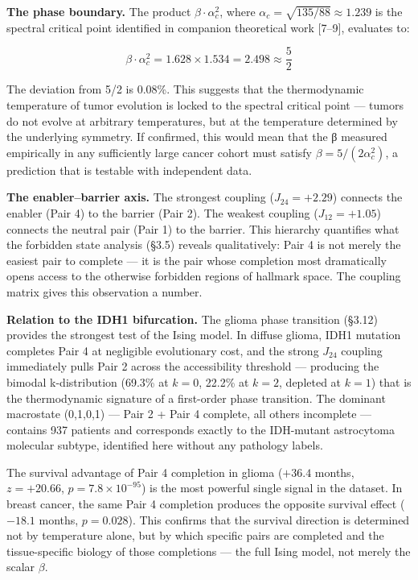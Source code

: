 \documentclass[
  11pt,
]{article}
\begin{document}
\textbf{The phase boundary.} The product \(\beta \cdot \alpha_c^2\),
where \(\alpha_c = \sqrt{135/88} \approx 1.239\) is the spectral
critical point identified in companion theoretical work {[}7--9{]},
evaluates to:

\[\beta \cdot \alpha_c^2 = 1.628 \times 1.534 = 2.498 \approx \frac{5}{2} \tag{9}\]

The deviation from 5/2 is 0.08\%. This suggests that the thermodynamic
temperature of tumor evolution is locked to the spectral critical point
--- tumors do not evolve at arbitrary temperatures, but at the
temperature determined by the underlying symmetry. If confirmed, this
would mean that the β measured empirically in any sufficiently large
cancer cohort must satisfy \(\beta = 5/(2\alpha_c^2)\), a prediction
that is testable with independent data.

\textbf{The enabler--barrier axis.} The strongest coupling
(\(J_{24} = +2.29\)) connects the enabler (Pair 4) to the barrier (Pair
2). The weakest coupling (\(J_{12} = +1.05\)) connects the neutral pair
(Pair 1) to the barrier. This hierarchy quantifies what the forbidden
state analysis (§3.5) reveals qualitatively: Pair 4 is not merely the
easiest pair to complete --- it is the pair whose completion most
dramatically opens access to the otherwise forbidden regions of hallmark
space. The coupling matrix gives this observation a number.

\textbf{Relation to the IDH1 bifurcation.} The glioma phase transition
(§3.12) provides the strongest test of the Ising model. In diffuse
glioma, IDH1 mutation completes Pair 4 at negligible evolutionary cost,
and the strong \(J_{24}\) coupling immediately pulls Pair 2 across the
accessibility threshold --- producing the bimodal k-distribution (69.3\%
at \(k = 0\), 22.2\% at \(k = 2\), depleted at \(k = 1\)) that is the
thermodynamic signature of a first-order phase transition. The dominant
macrostate (0,1,0,1) --- Pair 2 + Pair 4 complete, all others incomplete
--- contains 937 patients and corresponds exactly to the IDH-mutant
astrocytoma molecular subtype, identified here without any pathology
labels.

The survival advantage of Pair 4 completion in glioma (\(+36.4\) months,
\(z = +20.66\), \(p = 7.8 \times 10^{-95}\)) is the most powerful single
signal in the dataset. In breast cancer, the same Pair 4 completion
produces the opposite survival effect (\(-18.1\) months, \(p = 0.028\)).
This confirms that the survival direction is determined not by
temperature alone, but by which specific pairs are completed and the
tissue-specific biology of those completions --- the full Ising model,
not merely the scalar \(\beta\).
\end{document}
